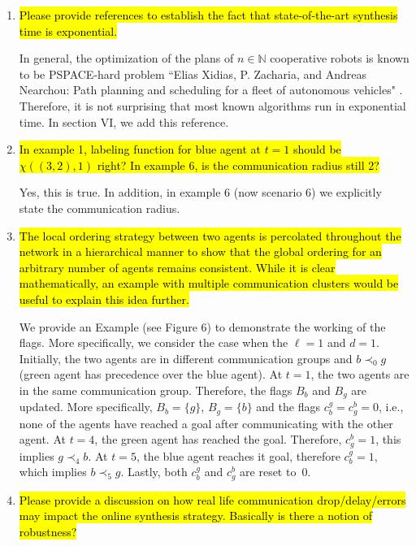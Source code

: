 \documentclass{article}[12pt]
\begin{document}
\begin{enumerate}
\item \hl{ Please provide references to establish the fact that state-of-the-art synthesis time is exponential. }

In general, the optimization of the plans of $n \in \mathbb{N}$ cooperative robots is known to be PSPACE-hard problem  ``Elias  Xidias,  P.  Zacharia,  and  Andreas  Nearchou: Path  planning  and scheduling for a fleet of autonomous vehicles" \cite{hardness}. Therefore, it is not surprising that most known algorithms run in exponential time. In section VI, we add this reference.

\item \hl{In example 1, labeling function for blue agent at $t=1$ should be $\chi((3,2),1)$ right? In example 6, is the communication radius still 2?}

Yes, this is true. In addition, in example 6 (now scenario 6) we explicitly state the communication radius.

\item \hl{The local ordering strategy between two agents is percolated throughout the network in a hierarchical manner to show that the global ordering for an arbitrary number of agents remains consistent. While it is clear mathematically, an example with multiple communication clusters would be useful to explain this idea further. }

We provide an Example (see Figure 6) to demonstrate the working of the flags. More specifically, we consider the case when the $\ell=1$ and $d=1$. 
Initially, the two agents are in different communication groups and $b \prec_0 g$ (green agent has precedence over the blue agent). At $t=1$, the two agents are in the same communication group. Therefore, the flags $B_b$ and $B_g$ are updated. More specifically, $B_{b} = \{g\}$, $B_{g} = \{b\}$ and the flags $c_b^g = c_g^b = 0$, i.e., none of the agents have reached a goal after communicating with the other agent. At $t=4$, the green agent has reached the goal. Therefore, $c_g^b=1$, this implies $g \prec_4 b$.  At $t=5$, the blue agent reaches it goal, therefore $c_b^g =1$, which implies $b \prec_5 g$. Lastly, both $c_b^g$ and $c_g^b$ are reset to~$0$.


\item \hl{Please provide a discussion on how real life communication drop/delay/errors may impact the online synthesis strategy. Basically is there a notion of robustness?}


\end{enumerate}
\end{document}

